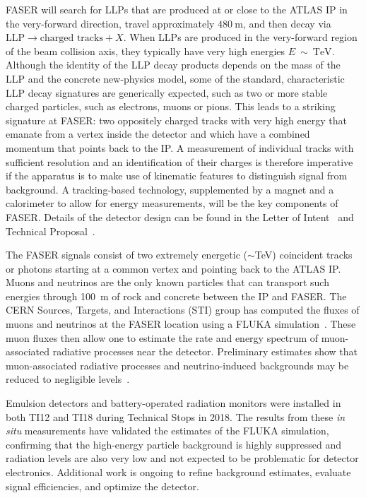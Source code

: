 FASER will search for LLPs that are produced at or close to the ATLAS IP in the very-forward direction, travel approximately $480~\text{m}$, and then decay via $\text{LLP} \to \text{charged tracks} + X$.  When LLPs are produced in the very-forward region of the beam collision axis, they typically have very high energies $E~\sim~\text{TeV}$. Although the identity of the LLP decay products depends on the mass of the LLP and the concrete new-physics model, some of the standard, characteristic LLP decay signatures are generically expected, such as two or more stable charged particles, such as electrons, muons or pions. This leads to a striking signature at FASER: two oppositely charged tracks with very high energy that emanate from a vertex inside the detector and which have a combined momentum that points back to the IP. A measurement of individual tracks with sufficient resolution and an identification of their charges is therefore imperative if the apparatus is to make use of kinematic features to distinguish signal from background. A tracking-based technology, supplemented by a magnet and a calorimeter to allow for energy measurements, will be the key components of FASER. Details of the detector design can be found in the Letter of Intent~\cite{Ariga:2018zuc} and Technical Proposal~\cite{Ariga:2018pin}. 

The FASER signals consist of two extremely energetic ($\sim$TeV) coincident tracks or photons starting at a common vertex and pointing back to the ATLAS IP. Muons and neutrinos are the only known particles that can transport such energies through 100~m of rock and concrete between the IP and FASER. The CERN Sources, Targets, and Interactions (STI) group has computed the fluxes of muons and neutrinos at the FASER location using a FLUKA simulation~\cite{Ferrari:2005zk,Bohlen:2014buj,FLUKAstudy}. These muon fluxes then allow one to estimate the rate and energy spectrum of muon-associated radiative processes near the detector. Preliminary estimates show that muon-associated radiative processes and neutrino-induced backgrounds may be reduced to negligible levels~\cite{Ariga:2018pin,Ariga:2018pin}.

Emulsion detectors and battery-operated radiation monitors were installed in both TI12 and TI18 during Technical Stops in 2018. The results from these \textit{in situ} measurements have validated the estimates of the FLUKA simulation, confirming that the high-energy particle background is highly suppressed and radiation levels are also very low and not expected to be problematic for detector electronics. Additional work is ongoing to refine background estimates, evaluate signal efficiencies, and optimize the detector.
\medskip

